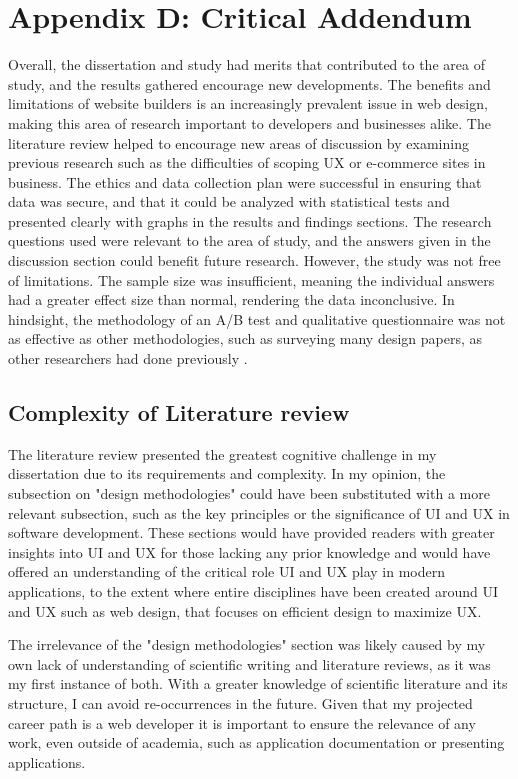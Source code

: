 \documentclass[article]{IEEEtran}
\begin{document}
        \section*{Appendix D: Critical Addendum}
            Overall, the dissertation and study had merits that contributed to the area of study, and the results gathered encourage new developments. The benefits and limitations of website builders is an increasingly prevalent issue in web design, making this area of research important to developers and businesses alike. The literature review helped to encourage new areas of discussion by examining previous research such as the difficulties of scoping UX or e-commerce sites in business. The ethics and data collection plan were successful in ensuring that data was secure, and that it could be analyzed with statistical tests and presented clearly with graphs in the results and findings sections. The research questions used were relevant to the area of study, and the answers given in the discussion section could benefit future research. However, the study was not free of limitations. The sample size was insufficient, meaning the individual answers had a greater effect size than normal, rendering the data inconclusive. In hindsight, the methodology of an A/B test and qualitative questionnaire was not as effective as other methodologies, such as surveying many design papers, as other researchers had done previously \cite{sudiana, udo}.

            \subsection{Complexity of Literature review}
                The literature review presented the greatest cognitive challenge in my dissertation due to its requirements and complexity. In my opinion, the subsection on "design methodologies" could have been substituted with a more relevant subsection, such as the key principles or the significance of UI and UX in software development. These sections would have provided readers with greater insights into UI and UX for those lacking any prior knowledge and would have offered an understanding of the critical role UI and UX play in modern applications, to the extent where entire disciplines have been created around UI and UX such as web design, that focuses on efficient design to maximize UX.
            
                The irrelevance of the "design methodologies" section was likely caused by my own lack of understanding of scientific writing and literature reviews, as it was my first instance of both. With a greater knowledge of scientific literature and its structure, I can avoid re-occurrences in the future. Given that my projected career path is a web developer it is important to ensure the relevance of any work, even outside of academia, such as application documentation or presenting applications. 
\end{document}
